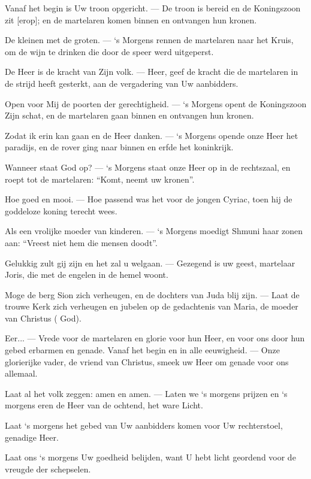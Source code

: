\documentclass[12pt,twoside,a5paper]{article}
\begin{document}
\begin{halfparskip}
  Vanaf het begin is Uw troon opgericht. --- De troon is bereid en de Koningszoon zit [erop]; en de martelaren komen binnen en ontvangen hun kronen.

  De kleinen met de groten. --- `s Morgens rennen de martelaren naar het Kruis, om de wijn te drinken die door de speer werd uitgeperst.

  De Heer is de kracht van Zijn volk. --- Heer, geef de kracht die de martelaren in de strijd heeft gesterkt, aan de vergadering van Uw aanbidders.

  Open voor Mij de poorten der gerechtigheid. --- `s Morgens opent de Koningszoon Zijn schat, en de martelaren gaan binnen en ontvangen hun kronen.

  Zodat ik erin kan gaan en de Heer danken. --- `s Morgens opende onze Heer het paradijs, en de rover ging naar binnen en erfde het koninkrijk.

  Wanneer staat God op? --- `s Morgens staat onze Heer op in de rechtszaal, en roept tot de martelaren: ``Komt, neemt uw kronen''.

  Hoe goed en mooi. --- Hoe passend was het voor de jongen Cyriac, toen hij de goddeloze koning terecht wees.

  Als een vrolijke moeder van kinderen. --- `s Morgens moedigt Shmuni haar zonen aan: ``Vreest niet hem die mensen doodt''.

  Gelukkig zult gij zijn en het zal u welgaan. --- Gezegend is uw geest, martelaar Joris, die met de engelen in de hemel woont.

  Moge de berg Sion zich verheugen, en de dochters van Juda blij zijn. --- Laat de trouwe Kerk zich verheugen en jubelen op de gedachtenis van Maria, de moeder van Christus ( God).

  Eer... --- Vrede voor de martelaren en glorie voor hun Heer, en voor ons door hun gebed erbarmen en genade. Vanaf het begin en in alle eeuwigheid. --- Onze glorierijke vader, de vriend van Christus, smeek uw Heer om genade voor ons allemaal.

  Laat al het volk zeggen: amen en amen. --- Laten we `s morgens prijzen en `s morgens eren de Heer van de ochtend, het ware Licht.

  Laat `s morgens het gebed van Uw aanbidders komen voor Uw rechterstoel, genadige Heer.

  Laat ons `s morgens Uw goedheid belijden, want U hebt licht geordend voor de vreugde der schepselen.
\end{halfparskip}
\end{document}
